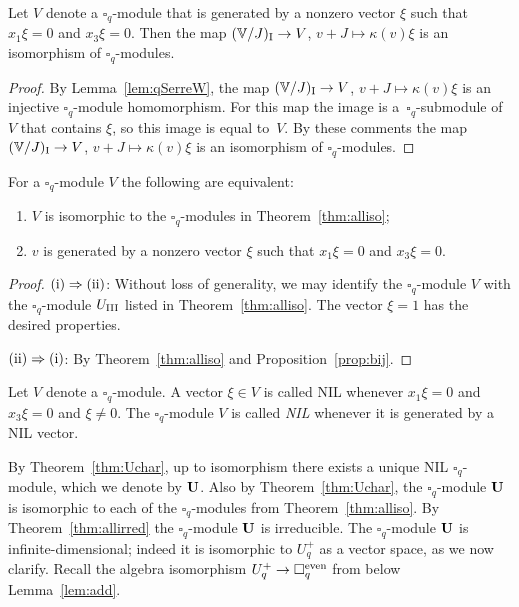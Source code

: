 \begin{Proposition}\label{prop:bij} Let $V$ denote a $\square_q$-module that is generated by a nonzero vector $\xi$ such that $x_1 \xi = 0 $ and $x_3 \xi = 0$. Then the map $(\mathbb V/J)_{\rm I} \to V$, $v+J \mapsto \kappa(v)\xi$ is an isomorphism of $\square_q$-modules.
\end{Proposition}
\begin{proof}By Lemma~\ref{lem:qSerreW}, the map $(\mathbb V/J)_{\rm I} \to V$, $v+J \mapsto \kappa(v)\xi$
is an injective $\square_q$-module homomorphism. For this map the image is a~$\square_q$-submodule of $V$ that contains $\xi$, so this image is equal to~$V$. By these comments the map $(\mathbb V/J)_{\rm I} \to V$, $v+J \mapsto \kappa(v)\xi$ is an isomorphism of $\square_q$-modules.
\end{proof}

\begin{Theorem}\label{thm:Uchar} For a $\square_q$-module $V$ the following are equivalent:
\begin{enumerate}\itemsep=0pt
\item[\rm (i)] $V$ is isomorphic to the $\square_q$-modules in Theorem~{\rm \ref{thm:alliso}};
\item[\rm (ii)] $v$ is generated by a nonzero vector $\xi$ such that $x_1 \xi = 0 $ and $x_3 \xi = 0$.
\end{enumerate}
\end{Theorem}
\begin{proof}${\rm (i)} \Rightarrow {\rm (ii)}$: Without loss of generality, we may identify the $\square_q$-module $V$ with the $\square_q$-module $U_{\rm III}$ listed in Theorem~\ref{thm:alliso}.
The vector $\xi=1$ has the desired properties.

${\rm (ii)} \Rightarrow {\rm (i)}$: By Theorem~\ref{thm:alliso} and Proposition~\ref{prop:bij}.
\end{proof}

\begin{Definition}Let $V$ denote a $\square_q$-module. A vector $\xi \in V$ is called {\rm NIL} whenever
$x_1 \xi = 0$ and $x_3 \xi = 0$ and $\xi \not= 0$. The $\square_q$-module $V$ is called {\it NIL} whenever it is generated by a NIL vector.
\end{Definition}

By Theorem~\ref{thm:Uchar}, up to isomorphism there exists a unique NIL $\square_q$-module, which we denote by $\bf U$. Also by Theorem~\ref{thm:Uchar}, the $\square_q$-module $\bf U$ is isomorphic to each of the
$\square_q$-modules from Theorem~\ref{thm:alliso}. By Theorem~\ref{thm:allirred} the $\square_q$-module $\bf U$ is irreducible. The $\square_q$-module $\bf U$ is infinite-dimensional; indeed it is isomorphic to $U^+_q$ as a vector space, as we now clarify. Recall the algebra isomorphism $U^+_q \to \square^{\rm even}_q$ from below Lemma~\ref{lem:add}.

